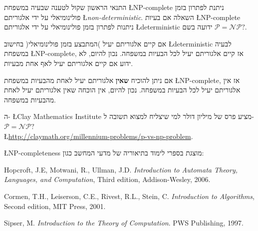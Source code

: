 \documentclass[12pt,a4paper]{article}
\begin{document}
התנאי הראשון שקול לטענה שבעיה במשפחת
\L{NP-complete}
ניתנת לפתרון בזמן פולינומיאלי על ידי אלגוריתם
\L{\emph{non-deterministic}}.
השאלה אם בעיות 
\L{NP-complete}
ניתנות לפתרון בזמן פולינומיאלי על ידי אלגוריתם
\L{deterministic}
ידועה בשם
$\mathcal{P}=\mathcal{NP}?$.

אם קיים אלגוריתם יעיל )המתבצע בזמן פולינומיאלי( בחישוב
\L{deterministic}
לבעיה במשפחת
\L{NP-complete},
אז קיים אלגוריתם יעיל לכל הבעיות במשפחה. נכון להיום, לא ידוע אם קיים אלגוריתם יעיל לאף אחת מבעיות.

אם ניתן להוכיח 
\textbf{שאין}
אלגוריתם יעיל לאחת מהבעיות במשפחת
\L{NP-complete},
אז אין אלגוריתם יעיל לכל הבעיות במשפחה. נכון להיום, אין הוכחה שאין אלגוריתם יעיל לאחת מהבעיות במשפחה.

ה-%
\L{Clay Mathematics Institute}
מציע פרס של מיליון דולר למי שיצליח למצוא תשובה ל-%
$\mathcal{P}=\mathcal{NP}?$\\
\L{\url{http://claymath.org/millennium-problems/p-vs-np-problem}}.

\L{NP-completeness}
מוצגת בספרי לימוד בתיאוריה של מדעי המחשב כגון:

Hopcroft, J.E, Motwani, R., Ullman, J.D. \textit{Introduction to Automata Theory, Languages, and Computation}, Third edition,  Addison-Wesley, 2006.

Cormen, T.H., Leiserson, C.E., Rivest, R.L., Stein, C. \textit{Introduction to Algorithms}, Second edition, MIT Press, 2001.

Sipser, M. \textit{Introduction to the Theory of Computation}. PWS Publishing, 1997.
\end{document}
